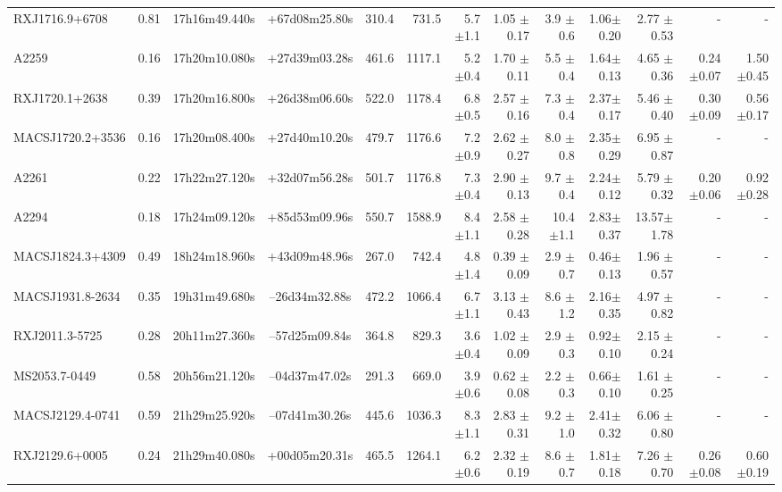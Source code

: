 \documentclass{aa}
\begin{document}
\begin{landscape}
\begin{longtable}{lcccrrrrrrrrr}
RXJ1716.9+6708  &0.81 & 17h16m49.440s &+67d08m25.80s  &  310.4   &  731.5   &  5.7  $\pm$1.1 & 1.05 $\pm$ 0.17&3.9  $\pm$0.6  & 1.06$\pm$0.20& 2.77 $\pm$0.53& - & -   \\
A2259   	 &0.16 & 17h20m10.080s &+27d39m03.28s  &  461.6   &  1117.1  &  5.2  $\pm$0.4 & 1.70 $\pm$ 0.11&5.5  $\pm$0.4  & 1.64$\pm$0.13& 4.65 $\pm$0.36& 0.24 $\pm$0.07 &1.50 $\pm$0.45  \\
RXJ1720.1+2638  &0.39 & 17h20m16.800s &+26d38m06.60s  &  522.0   &  1178.4  &  6.8  $\pm$0.5 & 2.57 $\pm$ 0.16&7.3  $\pm$0.4  & 2.37$\pm$0.17& 5.46 $\pm$0.40& 0.30 $\pm$0.09 & 0.56 $\pm$0.17 \\
MACSJ1720.2+3536 &0.16 & 17h20m08.400s &+27d40m10.20s  &  479.7   &  1176.6  &  7.2  $\pm$0.9 & 2.62 $\pm$ 0.27&8.0  $\pm$0.8  & 2.35$\pm$0.29& 6.95 $\pm$0.87& - & -   \\
A2261  	 &0.22 & 17h22m27.120s &+32d07m56.28s  &  501.7   &  1176.8  &  7.3  $\pm$0.4 & 2.90 $\pm$ 0.13&9.7  $\pm$0.4  & 2.24$\pm$0.12& 5.79 $\pm$0.32 & 0.20 $\pm$0.06 & 0.92 $\pm$0.28 \\
A2294  	 &0.18 & 17h24m09.120s &+85d53m09.96s  &  550.7   &  1588.9  &  8.4  $\pm$1.1 & 2.58 $\pm$ 0.28&10.4 $\pm$1.1  & 2.83$\pm$0.37& 13.57$\pm$1.78& - & -   \\
MACSJ1824.3+4309 &0.49 & 18h24m18.960s &+43d09m48.96s  &  267.0   &  742.4   &  4.8  $\pm$1.4 & 0.39 $\pm$ 0.09&2.9  $\pm$0.7  & 0.46$\pm$0.13& 1.96 $\pm$0.57& - & -   \\
MACSJ1931.8-2634 &0.35 & 19h31m49.680s &--26d34m32.88s  &  472.2   &  1066.4  &  6.7  $\pm$1.1 & 3.13 $\pm$ 0.43&8.6  $\pm$1.2  & 2.16$\pm$0.35& 4.97 $\pm$0.82& - & -   \\
RXJ2011.3-5725  &0.28 & 20h11m27.360s &--57d25m09.84s  &  364.8   &  829.3   &  3.6  $\pm$0.4 & 1.02 $\pm$ 0.09&2.9  $\pm$0.3  & 0.92$\pm$0.10& 2.15 $\pm$0.24& - & -   \\
MS2053.7-0449   &0.58 & 20h56m21.120s &--04d37m47.02s  &  291.3   &  669.0   &  3.9  $\pm$0.6 & 0.62 $\pm$ 0.08&2.2  $\pm$0.3  & 0.66$\pm$0.10& 1.61 $\pm$0.25& - & -   \\
MACSJ2129.4-0741&0.59 & 21h29m25.920s &--07d41m30.26s &  445.6   &  1036.3  &  8.3  $\pm$1.1 & 2.83 $\pm$ 0.31&9.2  $\pm$1.0  & 2.41$\pm$0.32& 6.06 $\pm$0.80& - & -   \\
RXJ2129.6+0005  &0.24 & 21h29m40.080s & +00d05m20.31s &  465.5   &  1264.1  &  6.2  $\pm$0.6 & 2.32 $\pm$ 0.19&8.6  $\pm$0.7  & 1.81$\pm$0.18& 7.26 $\pm$0.70& 0.26 $\pm$0.08 & 0.60 $\pm$0.19  \\

\end{longtable}
\end{landscape}
\end{document}
